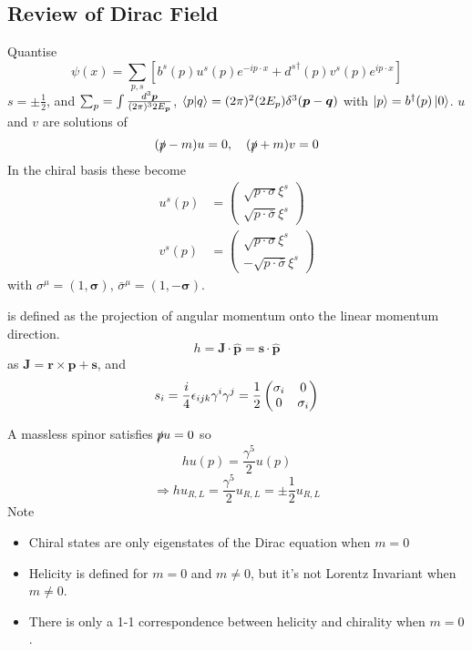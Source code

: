 \documentclass{article}
\begin{document}
\subsection{Review of Dirac Field}
Quantise 
\[
\psi(x) = \sum_{p,s} \left[ b^s(p) u^s(p) e^{-ip\cdot x} + {d^s}^\dagger(p) v^s(p) e^{ip\cdot x} \right]
\]
$s=\pm\frac{1}{2}$, and $\sum_p = \int \frac{d^3\bm{p}}{(2\pi)^32E_{\bm{p}}}$, $\braket{p|q} = (2\pi)^2 (2E_p)\delta^3(\bm{p}-\bm{q})$ with $\ket{p} = b^\dagger(p) \ket{0}$. $u$ and $v$ are solutions of 
\[
(\slashed{p}-m)u=0 , \quad (\slashed{p}+m)v=0
\]
In the chiral basis these become 
\begin{align*}
    u^s(p) &= \begin{pmatrix} \sqrt{p\cdot \sigma} \xi^s \\ \sqrt{p\cdot\bar{\sigma}} \xi^s \end{pmatrix} \\ 
    v^s(p) &= \begin{pmatrix} \sqrt{p\cdot \sigma} \xi^s \\ -\sqrt{p\cdot\bar{\sigma}} \xi^s \end{pmatrix}
\end{align*}
with $\sigma^\mu = (1, \bm{\sigma})$, $\bar{\sigma}^\mu = (1, -\bm{\sigma})$. 

\begin{definition}[Helicity]
 is defined as the projection of angular momentum onto the linear momentum direction. 
\[
h = \bm{J} \cdot \hat{\bm{p}} = \bm{s} \cdot \hat{\bm{p}}
\]
as $\bm{J} = \bm{r}\times\bm{p} + \bm{s}$, and 
\[
s_i = \frac{i}{4}\epsilon_{ijk} \gamma^i \gamma^j = \frac{1}{2} \begin{pmatrix} \sigma_i & 0 \\ 0 & \sigma_i \end{pmatrix}
\]
\end{definition}
A massless spinor satisfies $\slashed{p}u=0$
so 
\[
hu(p) = \frac{\gamma^5}{2} u(p) 
\]
\[
\Rightarrow hu_{R,L} = \frac{\gamma^5}{2} u_{R,L} = \pm \frac{1}{2} u_{R,L}
\]
Note
\begin{itemize}
     \item Chiral states are only eigenstates of the Dirac equation when $m=0$
     \item Helicity is defined for $m=0$ and $m\neq0$, but it's not Lorentz Invariant when $m\neq 0$. 
     \item There is only a 1-1 correspondence between helicity and chirality when $m=0$. 
\end{itemize}
\end{document}
